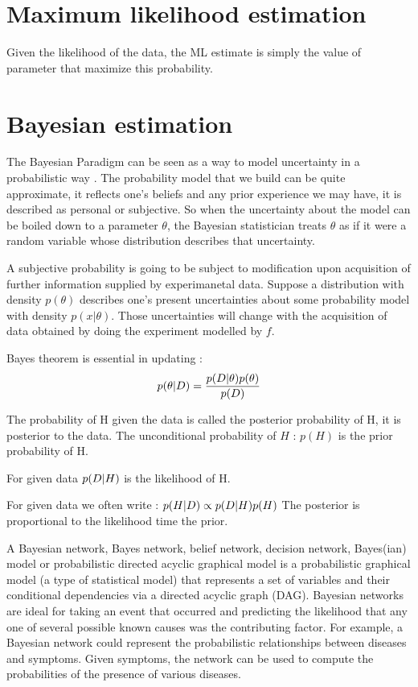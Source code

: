 \section{Maximum \gls{likelihood} estimation}

Given the likelihood of the data, the ML estimate is simply the value of parameter that maximize this probability.

\section{Bayesian estimation}

The Bayesian Paradigm can be seen as a way to model uncertainty in a probabilistic way .
The probability model that we build can be quite approximate, it reflects one's beliefs and any \gls{prior} experience we may have, it is described as personal or subjective.
So when the uncertainty about the model can be boiled down to a parameter $\theta$, the Bayesian statistician treats $\theta$ as if it were a random variable whose distribution describes that uncertainty.

A subjective probability is going to be subject to modification upon acquisition of further information supplied by experimanetal data.
Suppose a distribution with density $p(\theta)$ describes one's present uncertainties about some probability model with density $p(x|\theta)$.
Those uncertainties will change with the acquisition of data obtained by doing the experiment modelled by $f$.

Bayes theorem is essential in updating :
\begin{equation}
	p(\theta|D)=\frac{p(D|\theta)p(\theta)}{p(D)}
\end{equation}

The probability of H given the data is called the posterior
probability of H, it is \gls{posterior} to the data.
The unconditional probability of $H$ : $p(H)$ is the prior
probability of H.

For given data $p(D|H)$ is the \gls{likelihood} of H.

For given data we often write :
$p(H|D) \propto p(D|H) p(H)$
The \gls{posterior} is proportional to the \gls{likelihood} time the \gls{prior}.

A Bayesian network, Bayes network, belief network, decision network, Bayes(ian) model or probabilistic directed acyclic graphical model is a probabilistic graphical model (a type of statistical model) that represents a set of variables and their conditional dependencies via a directed acyclic graph (DAG). Bayesian networks are ideal for taking an event that occurred and predicting the \gls{likelihood} that any one of several possible known causes was the contributing factor. For example, a Bayesian network could represent the probabilistic relationships between diseases and symptoms. Given symptoms, the network can be used to compute the probabilities of the presence of various diseases. 

